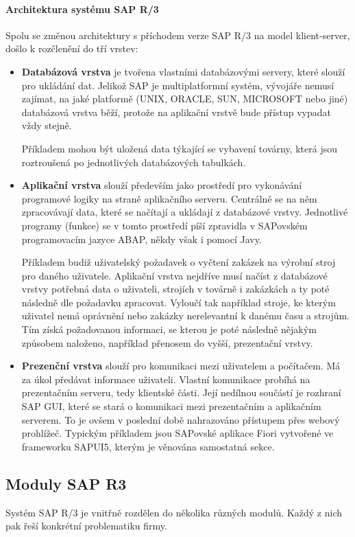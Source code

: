 \documentclass[thesis=M,czech]{FITthesis}[2012/06/26]
\begin{document}
\paragraph{Architektura systému SAP R/3} Spolu se změnou architektury s příchodem verze SAP R/3 na model klient-server, došlo k rozčlenění do tří vrstev:
\begin{itemize}
	\item
	\textbf{Databázová vrstva} je tvořena vlastními databázovými servery, které slouží pro ukládání dat. Jelikož SAP je multiplatformní systém, vývojáře nemusí zajímat, na jaké platformě (UNIX, ORACLE, SUN, MICROSOFT nebo jiné) databázová vrstva běží, protože na aplikační vrstvě bude přístup vypadat vždy stejně. 
	
	Příkladem mohou být uložená data týkající se vybavení továrny, která jsou roztroušená po jednotlivých databázových tabulkách.
	\item
	\textbf{Aplikační vrstva} slouží především jako prostředí pro vykonávání programové logiky na straně aplikačního serveru. Centrálně se na něm zpracovávají data, které se načítají a ukládají z databázové vrstvy. Jednotlivé programy (funkce) se v tomto prostředí píší zpravidla v SAPovském programovacím jazyce ABAP, někdy však i pomocí Javy. 
	
	Příkladem budiž uživatelský požadavek o vyčtení zakázek na výrobní stroj pro daného uživatele. Aplikační vrstva nejdříve musí načíst z databázové vrstvy potřebná data o uživateli, strojích v továrně i zakázkách a ty poté následně dle požadavku zpracovat. Vyloučí tak například stroje, ke kterým uživatel nemá oprávnění nebo zakázky nerelevantní k danému času a strojům. Tím získá požadovanou informaci, se kterou je poté následně nějakým způsobem naloženo, například přenosem do vyšší, prezentační vrstvy.
	\item
	\textbf{Prezenční vrstva} slouží pro komunikaci mezi uživatelem a počítačem. Má za úkol předávat informace uživateli. Vlastní komunikace probíhá na prezentačním serveru, tedy klientské části. Její nedílnou součástí je rozhraní SAP GUI, které se stará o komunikaci mezi prezentačním a aplikačním serverem. To je ovšem v poslední době nahrazováno přístupem přes webový prohlížeč. Typickým příkladem jsou SAPovské aplikace Fiori vytvořené ve frameworku SAPUI5, kterým je věnována samostatná sekce. 
\end{itemize} 	

\subsection{Moduly SAP R3}
Systém SAP R/3 je vnitřně rozdělen do několika různých modulů. Každý z nich pak řeší konkrétní problematiku firmy.
\end{document}
